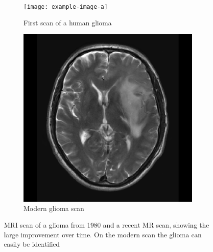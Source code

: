 \begin{figure}[hbt]
    \centering
    \begin{subfigure}[b]{0.45\textwidth}
        \centering
        \texttt{[image: example-image-a]}
        \caption{First scan of a human glioma}\label{fig:intro_MR_first}
    \end{subfigure}
    \begin{subfigure}[b]{0.45\textwidth}
        \centering
        \includegraphics[width=\textwidth]{Figures/T2_LGG.png}
        \caption{Modern glioma scan}\label{fig:intro_MR_modern}
    \end{subfigure}
    \caption{\acrshort{MRI} scan of a glioma from 1980 and a recent \acrshort{MR} scan, showing the large improvement over time. On the modern scan the glioma can easily be identified}\label{fig:intro_MR_comparison}
\end{figure}
